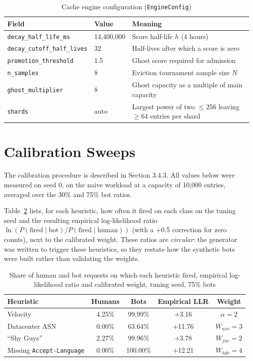 \begin{table}[htbp]
    \centering
    \caption{Cache engine configuration (\texttt{EngineConfig})}
    \label{tab:app-engine-config}
    \small
    \begin{tabular}{llp{}}
        \toprule
        Field & Value & Meaning \\
        \midrule
        \texttt{decay\_half\_life\_ms} & 14{,}400{,}000 & Score half-life $h$ (4 hours) \\
        \texttt{decay\_cutoff\_half\_lives} & 32 & Half-lives after which a score is zero \\
        \texttt{promotion\_threshold} & 1.5 & Ghost score required for admission \\
        \texttt{n\_samples} & 8 & Eviction tournament sample size $N$ \\
        \texttt{ghost\_multiplier} & 8 & Ghost capacity as a multiple of main capacity \\
        \texttt{shards} & auto & Largest power of two $\leq 256$ leaving $\geq 64$ entries per shard \\
        \bottomrule
    \end{tabular}
\end{table}

\section{Calibration Sweeps}
The calibration procedure is described in Section 3.4.3. All values below were measured on seed 0, on the naive workload at a capacity of 10{,}000 entries, averaged over the 30\% and 75\% bot ratios.

Table~\ref{tab:app-llr} lists, for each heuristic, how often it fired on each class on the tuning seed and the resulting empirical log-likelihood ratio $\ln(P(\text{fired} \mid \text{bot}) / P(\text{fired} \mid \text{human}))$ (with a +0.5 correction for zero counts), next to the calibrated weight. These ratios are \emph{circular}: the generator was written to trigger these heuristics, so they restate how the synthetic bots were built rather than validating the weights.

\begin{table}[htbp]
    \centering
    \caption{Share of human and bot requests on which each heuristic fired, empirical log-likelihood ratio and calibrated weight, tuning seed, 75\% bots}
    \label{tab:app-llr}
    \small
    \begin{tabular}{lcccc}
        \toprule
        Heuristic & Humans & Bots & Empirical LLR & Weight \\
        \midrule
        Velocity & 4.25\% & 99.99\% & +3.16 & $\alpha = 2$ \\
        Datacenter ASN & 0.00\% & 63.64\% & +11.76 & $W_{asn} = 3$ \\
        ``Shy Guys'' & 2.27\% & 99.96\% & +3.78 & $W_{fav} = 2$ \\
        Missing \texttt{Accept-Language} & 0.00\% & 100.00\% & +12.21 & $W_{hdr} = 4$ \\
        \bottomrule
    \end{tabular}
\end{table}

